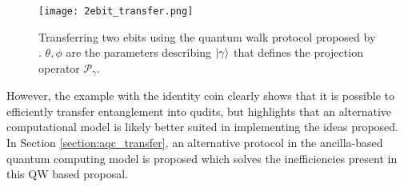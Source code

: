 \begin{figure}
    \centering
    \texttt{[image: 2ebit\_transfer.png]}
    \caption{Transferring two ebits using the quantum walk protocol proposed by \cite{giordani2020}. $\theta, \phi$ are the parameters describing $\ket{\gamma}$ that defines the projection operator $\mathcal{P}_\gamma$.}
    \label{fig:2ebittransfer}
\end{figure}

However, the example with the identity coin clearly shows that it is possible to efficiently transfer entanglement into qudits, but highlights that an alternative computational model is likely better suited in implementing the ideas proposed.
In Section \ref{section:aqc_transfer}, an alternative protocol in the ancilla-based quantum computing model is proposed which solves the inefficiencies present in this QW based proposal.